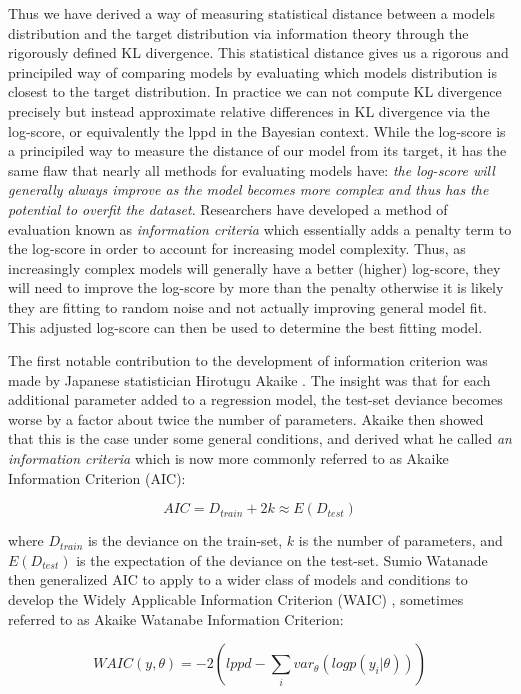 Thus we have derived a way of measuring statistical distance between a models distribution and the target distribution via information theory through the rigorously defined KL divergence. This statistical distance gives us a rigorous and principiled way of comparing models by evaluating which models distribution is closest to the target distribution. In practice we can not compute KL divergence precisely but instead approximate relative differences in KL divergence via the log-score, or equivalently the lppd in the Bayesian context. While the log-score is a principiled way to measure the distance of our model from its target, it has the same flaw that nearly all methods for evaluating models have: \textit{the log-score will generally always improve as the model becomes more complex and thus has the potential to overfit the dataset}. Researchers have developed a method of evaluation known as \textit{information criteria} which essentially adds a penalty term to the log-score in order to account for increasing model complexity. Thus, as increasingly complex models will generally have a better (higher) log-score, they will need to improve the log-score by more than the penalty otherwise it is likely they are fitting to random noise and not actually improving general model fit. This adjusted log-score can then be used to determine the best fitting model.

The first notable contribution to the development of information criterion was made by Japanese statistician Hirotugu Akaike \cite{Akaike1974}. The insight was that for each additional parameter added to a regression model, the test-set deviance becomes worse by a factor about twice the number of parameters. Akaike then showed that this is the case under some general conditions, and derived what he called \textit{an information criteria} which is now more commonly referred to as Akaike Information Criterion (AIC):

\begin{equation}
AIC = D_{train} + 2k \approx E(D_{test})
\end{equation}

where $D_{train}$ is the deviance on the train-set, $k$ is the number of parameters, and $E(D_{test})$ is the expectation of the deviance on the test-set. Sumio Watanade then generalized AIC to apply to a wider class of models and conditions to develop the Widely Applicable Information Criterion (WAIC) \cite{Watanabe2010}, sometimes referred to as Akaike Watanabe Information Criterion:

\begin{equation} \label{eq:waic}
WAIC(y, \theta) = -2 \left( lppd - \sum_i var_{\theta}(logp(y_i|\theta)) \right)
\end{equation}

